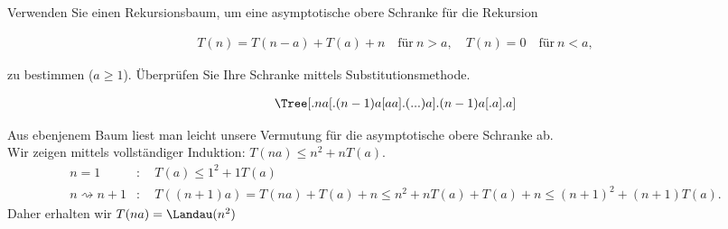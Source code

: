 
\begin{exercise}

Verwenden Sie einen Rekursionsbaum, um eine asymptotische obere Schranke für die Rekursion

\begin{align*}
  T(n) = T(n-a) + T(a) + n \quad \text{für}~ n > a,\quad T(n) = 0 \quad \text{für}~ n < a,
\end{align*}

zu bestimmen ($a \geq 1$). Überprüfen Sie Ihre Schranke mittels Substitutionsmethode.
\end{exercise}


\begin{solution}
\begin{align*}
  \Tree [.na [.(n-1)a [ a a ].(...) a ].(n-1)a [.a ].a ]
\end{align*}

Aus ebenjenem Baum liest man leicht unsere Vermutung für die asymptotische obere Schranke ab. \\
Wir zeigen mittels vollständiger Induktion: $T(na) \leq n^2 + nT(a)$.
\begin{align*}
  n = 1&: \quad T(a) \leq 1^2 + 1T(a) \\
  n \rightsquigarrow n+1&: \quad T((n+1)a) = T(na) + T(a) + n \leq n^2 + nT(a) + T(a) + n
  \leq (n+1)^2 + (n+1)T(a).
\end{align*}
Daher erhalten wir $T(na) = \Landau(n^2)$
\end{solution}

